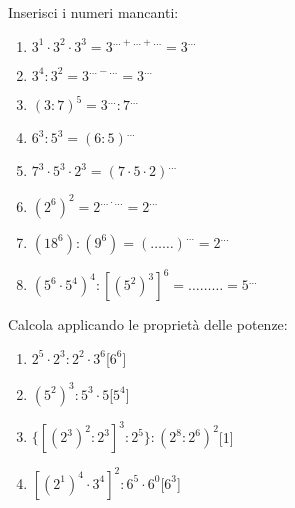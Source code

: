 \subsubsection*{}

\begin{esercizio}
Inserisci i numeri mancanti:
 \begin{multicols}{2}
 \begin{enumerate}[noitemsep, label=(\alph*)]
 \item \(3^1\cdot3^2\cdot3^3=3^{\ldots+\ldots+\ldots}=3^{\ldots}\)
 \item \(3^4:3^2=3^{\ldots-\ldots}=3^{\ldots}\)
 \item \((3:7)^5=3^{\ldots}:7^{\ldots}\)
 \item \(6^3:5^3=(6:5)^{\ldots}\)
 \item \(7^3\cdot5^3\cdot2^3=(7\cdot 5 \cdot 2)^{\ldots}\)
 \item \((2^6)^2=2^{\ldots\cdot\ldots}=2^{\ldots}\)
 \item \((18^6):(9^6)=(\ldots\ldots)^{\ldots}=2^{\ldots}\)
 \item \((5^6\cdot5^4)^4:[(5^2)^3]^6=\ldots\ldots\ldots=5^{\ldots}\)
 \end{enumerate}

 \end{multicols}
\end{esercizio}

% 
\begin{esercizio}[*]
Calcola applicando le proprietà delle potenze:
 \begin{multicols}{2}
 \begin{enumerate}[noitemsep, label=(\alph*)]
 \item \(2^5\cdot2^3:2^2\cdot3^6\)\hfill[\(6^6\)]
 \item \((5^2)^3:5^3\cdot5\)\hfill[\(5^4\)]
 \item \(\{[(2^3)^2:2^3]^3:2^5\}:(2^8:2^6)^2\)\hfill[1]
 \item \([(2^1)^4\cdot 3^4]^2:6^5\cdot6^0\)\hfill[\(6^3\)]
 \end{enumerate}
 \end{multicols}
\end{esercizio}

